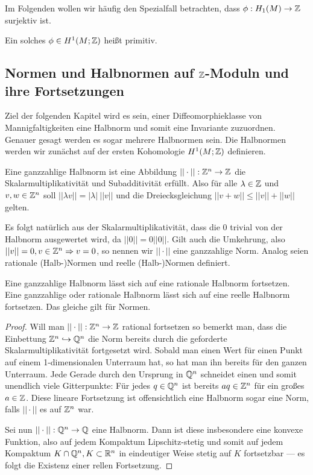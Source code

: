 Im Folgenden wollen wir häufig den Spezialfall betrachten, dass $\phi: H_1(M) \to \mathbb{Z}$ surjektiv ist. 
\begin{defn}
	Ein solches $\phi \in H^1(M;\mathbb{Z})$ heißt primitiv.
\end{defn}

\subsection{Normen und Halbnormen auf $\mathbb{Z}$-Moduln und ihre Fortsetzungen}
    
    Ziel der folgenden Kapitel wird es sein, einer Diffeomorphieklasse von Mannigfaltigkeiten eine Halbnorm und somit eine Invariante zuzuordnen. Genauer gesagt werden es sogar mehrere Halbnormen sein. Die Halbnormen werden wir zunächst auf der ersten Kohomologie $H^1(M;\mathbb{Z})$ definieren. 

    \begin{defn}
    	Eine ganzzahlige Halbnorm ist eine Abbildung $||\cdot||: \mathbb{Z}^n \to \mathbb{Z}$  die Skalarmultiplikativität und Subadditivität erfüllt. Also für alle $\lambda \in \mathbb{Z}$ und $v,w\in \mathbb{Z}^n$ soll $||\lambda v||=\vert\lambda\vert~||v||$ und die Dreiecksgleichung $||v+w||\le ||v||+||w||$ gelten.
    \end{defn}
    Es folgt natürlich aus der Skalarmultiplikativität, dass die $0$ trivial von der Halbnorm ausgewertet wird, da $||0|| = 0||0||$. Gilt auch die Umkehrung, also $||v||=0, v\in \mathbb{Z}^n \Rightarrow v=0$, so nennen wir $||\cdot ||$ eine ganzzahlige Norm. Analog seien rationale (Halb-)Normen und reelle (Halb-)Normen definiert. 
    \begin{lem}
    	Eine ganzzahlige Halbnorm lässt sich auf eine rationale Halbnorm fortsetzen. Eine ganzzahlige oder rationale Halbnorm lässt sich auf eine reelle Halbnorm fortsetzen. Das gleiche gilt für Normen.
    \end{lem}
    \begin{proof}
    	Will man $||\cdot||:  \mathbb{Z}^n \to \mathbb{Z}$ rational fortsetzen so bemerkt man, dass die Einbettung $\mathbb{Z}^n \hookrightarrow \mathbb{Q}^n$ die Norm bereits durch die geforderte Skalarmultiplikativität fortgesetzt wird. Sobald man einen Wert für einen Punkt auf einem 1-dimensionalen Unterraum hat, so hat man ihn bereits für den ganzen Unterraum. Jede Gerade durch den Ursprung in $\mathbb{Q}^n$ schneidet einen und somit unendlich viele Gitterpunkte: Für jedes $q \in \mathbb{Q}^n$ ist bereits $aq \in \mathbb{Z}^n$ für ein großes $a\in \mathbb{Z}$. Diese lineare Fortsetzung ist offensichtlich eine Halbnorm sogar eine Norm, falls $||\cdot||$ es auf $\mathbb{Z}^n$ war.

    	Sei nun $||\cdot||: \mathbb{Q}^n \to \mathbb{Q}$ eine Halbnorm. Dann ist diese insbesondere eine konvexe Funktion, also auf jedem Kompaktum Lipschitz-stetig und somit auf jedem Kompaktum $K\cap \mathbb{Q}^n, K\subset \mathbb{R}^n$ in eindeutiger Weise stetig auf $K$ fortsetzbar --- es folgt die Existenz einer rellen Fortsetzung.
    \end{proof}




